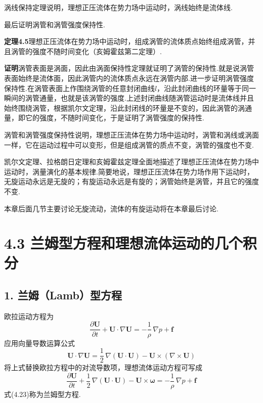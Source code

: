 涡线保持定理说明，理想正压流体在势力场中运动时，涡线始终是流体线.

最后证明涡管和涡管强度保持性.

\noindent\textbf{定理4.5}\quad 理想正压流体在势力场中运动时，组成涡管的流体质点始终组成涡管，并且涡管的强度不随时间变化（亥姆霍兹第二定理）.

\textbf{证明}\quad 涡管表面是涡面，因此由涡面保持性定理就证明了涡管的保持性.就是说涡管表面始终是流体面，因此涡管内的流体质点永远在涡管内部.进一步证明涡管强度保持性.在涡管表面上作围绕涡管的任意封闭曲线$l$，沿此封闭曲线的环量等于同一瞬间的涡管通量，也就是该涡管的强度.上述封闭曲线随涡管运动时是流体线并且始终围绕涡管，根据凯尔文定理，沿此封闭线的环量是不变的，因此涡管的涡通量，即它的强度，不随时间变化，于是证明了涡管强度的保持性.

涡管和涡管强度保持性说明，理想正压流体在势力场中运动时，涡管和涡线或涡面一样，它在运动过程中可以变形，但是组成涡管的质点不变，涡管的强度也不变.

凯尔文定理、拉格朗日定理和亥姆霍兹定理全面地描述了理想正压流体在势力场中运动时，涡量演化的基本规律.简要地说，理想正压流体在势力场作用下运动时，无旋运动永远是无旋的；有旋运动永远是有旋的；涡管始终是涡管，并且它的强度不变.

本章后面几节主要讨论无旋流动，流体的有旋运动将在本章最后讨论.

\section*{4.3  兰姆型方程和理想流体运动的几个积分}

\subsection*{1. 兰姆（Lamb）型方程}

欧拉运动方程为
\[
\frac{\partial\boldsymbol{U}}{\partial t}+\boldsymbol{U}\cdot\nabla\boldsymbol{U}=-\frac{1}{\rho}\,\nabla p+\boldsymbol{f}
\]
应用向量导数运算公式
\[
\boldsymbol{U}\cdot\nabla\boldsymbol{U}=\frac{1}{2}\,\nabla(\boldsymbol{U}\cdot\boldsymbol{U})-\boldsymbol{U}\times(\nabla\times\boldsymbol{U})
\]
将上式替换欧拉方程中的对流导数项，理想流体运动方程可写成
\begin{equation*}
\frac{\partial\boldsymbol{U}}{\partial t}+\frac{1}{2}\,\nabla(\boldsymbol{U}\cdot\boldsymbol{U})-\boldsymbol{U}\times\boldsymbol{\omega}=-\frac{1}{\rho}\,\nabla p+\boldsymbol{f}
\tag{4.23}
\end{equation*}
式(4.23)称为兰姆型方程.

